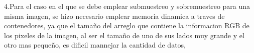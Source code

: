\documentclass{article}
\begin{document}
4.Para el caso en el que se debe emplear submuestreo y sobremuestreo para una misma imagen, se hizo necesario emplear memoria dinamica a traves de contenedores, ya que el tamaño del arreglo que contiene la informacion RGB de los pixeles de la imagen, al ser el tamaño de uno de sus lados muy grande y el otro mas pequeño, es dificil mannejar la cantidad de datos,\\ 








\end{document}
